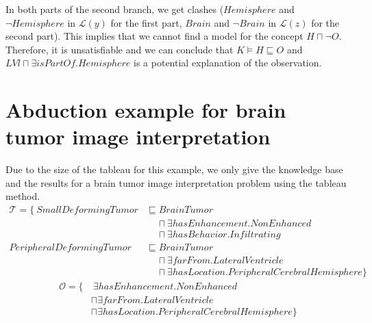 \documentclass{article}
\begin{document}
\begin{center}
\end{center}

In both parts of the second branch, we get clashes ($Hemisphere$ and $\neg Hemisphere$ in $\mathcal{L}(y)$ for the first part, $Brain$ and $\neg Brain$ in $\mathcal{L}(z)$ for the second part).
This implies that we cannot find a model for the concept $H\sqcap \neg O$. Therefore, it is unsatisfiable and we can conclude that $K\vDash H\sqsubseteq O$ and $LVl\sqcap \exists isPartOf.Hemisphere$ is a potential
explanation of the observation.

\section{Abduction example for brain tumor image interpretation}
\label{Appendix B}
Due to the size of the tableau for this example, we only give the knowledge base and the results for a brain tumor image interpretation problem using the tableau method.
\begin{align*}
\mathcal{T}=\{~SmallDeformingTumor &\sqsubseteq BrainTumor\\
 &~~~~~\sqcap \exists hasEnhancement. NonEnhanced \\
&~~~~~\sqcap \exists hasBehavior. Infiltrating  \\
PeripheralDeformingTumor &\sqsubseteq BrainTumor\\
&~~~~~ \sqcap \exists farFrom. LateralVentricle \\
&~~~~~ \sqcap \exists hasLocation. PeripheralCerebralHemisphere \} 
\end{align*}\vspace{-0.9cm}
\begin{align*}
\mathcal{O} =\{&~\exists hasEnhancement. NonEnhanced \\
 &\sqcap \exists farFrom. LateralVentricle \\
&\sqcap \exists hasLocation. PeripheralCerebralHemisphere \} 
\end{align*}
\end{document}
